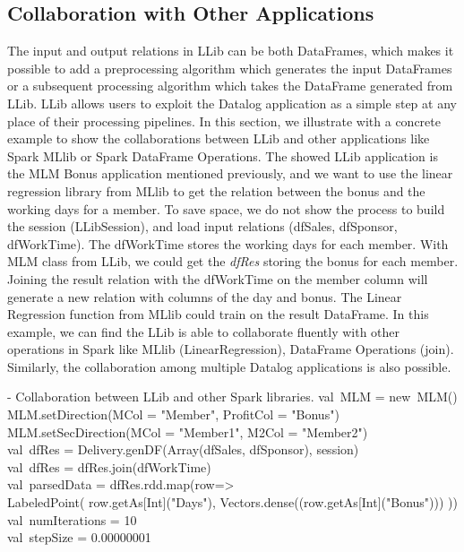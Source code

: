 \subsection{Collaboration with Other Applications}
The input and output relations in LLib can be both DataFrames, which makes it possible to add a preprocessing algorithm which generates the input DataFrames  or  a subsequent processing algorithm which takes the DataFrame generated from LLib. LLib allows users to exploit the Datalog application as a simple step at any place of their  processing pipelines. In this section, we illustrate with a concrete example to show the collaborations between LLib and other applications like Spark MLlib or Spark DataFrame Operations. The showed LLib application is the MLM Bonus application mentioned previously, and we want to use the linear regression library from MLlib to get the relation between the bonus and the working days for a member. To save space, we do not show the process to build the session (LLibSession), and load input relations (dfSales, dfSponsor, dfWorkTime).  The dfWorkTime stores the working days for each member. With MLM class from LLib, we could get the \textit{dfRes} storing the bonus for each member. Joining the result relation with the dfWorkTime on the member column will generate a new relation with columns of the day and bonus. The Linear Regression function from MLlib could train on the result DataFrame. In this example, we can find the  LLib is able to collaborate fluently with other operations in Spark like MLlib (LinearRegression), DataFrame Operations (join). Similarly, the collaboration among multiple Datalog applications is also possible.  

\vspace{0.5em}
 - Collaboration between LLib and other Spark libraries.
\bldl
val\ MLM = new\ MLM()\\
MLM.setDirection(MCol = "Member", ProfitCol = "Bonus")\\
MLM.setSecDirection(MCol = "Member1", M2Col = "Member2") \\
val\ dfRes = Delivery.genDF(Array(dfSales, dfSponsor), session)\\
val\ dfRes = dfRes.join(dfWorkTime)\\ 
val\ parsedData = dfRes.rdd.map(row=>\\ LabeledPoint(
row.getAs[Int]("Days"),
Vectors.dense((row.getAs[Int]("Bonus")))
))\\
val\ numIterations = 10 \\
val\ stepSize = 0.00000001 \\

